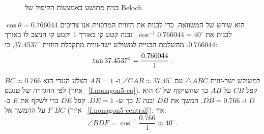 \begin{figure}
\begin{center}
\end{center}
\caption{בנית מתושע באמצעות הקיפול של Beloch}\label{f.nonagon-beloch}
\end{figure}

$\cos\theta=0.766044$
הוא שורש של המשוואה. כדי לבנות את הזווית המרכזית אנו צריכים לבנות  את
$\cos^{-1} 0.766044=40^\circ$.
נבנה קטע קו באורך
$1$
וקטע קו הניצב לו באורך 
$0.766044$.
מהשלמת הבנייה למשולש ישר-זווית מתקבלת הזווית
$37.4537^\circ$,
כי:
\[
\tan 37.4537^\circ = \displaystyle\frac{0.766044}{1}\,.
\]

למשולש ישר-זווית
$\triangle ABC$
עם 
$\angle CAB\approx 37.45^\circ$
ו-%
$\overline{AB}=1$
הצלע הנגדי הוא
$\overline{BC}\approx 0.766$
לפי ההגדרה של טנגנס (איור%
~\ref{f.nonagon5-eq}).
קפל 
$\overline{CB}$
על
$\overline{AB}$
כך שהשיקוף של
$C$
הוא
$D$
ו-%
$\overline{DB}=0.766$.
המשך את
$\overline{DB}$
ובנה
$E$
כך ש-%
$\overline{DE}=1$.
קפל
$\overline{DE}$
כדי לשקף את
$E$ 
ב-%
$F$
על ההמשך אל
$\overline{BC}$
(איור%
~\ref{f.nonagon5-central}).
אזי:
\[
\angle BDF=\cos^{-1} \frac{0.766}{1}\approx 40^\circ\,.
\]


